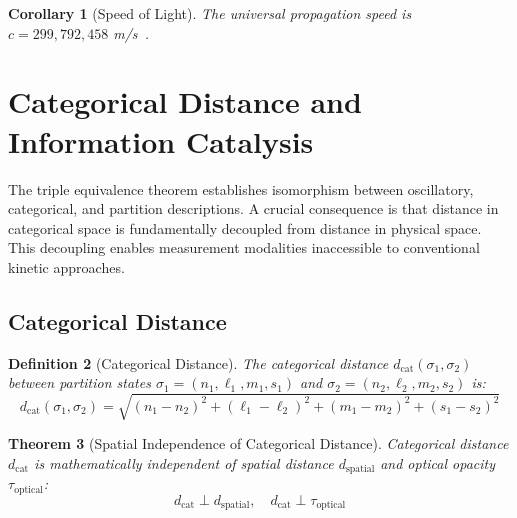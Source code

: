 \documentclass[aps,prd,twocolumn,superscriptaddress,floatfix,nofootinbib]{revtex4-2}
\newtheorem{theorem}{Theorem}[section]
\newtheorem{corollary}[theorem]{Corollary}
\newtheorem{definition}[theorem]{Definition}
\theoremstyle{remark}
\newcommand{\dcat}{d_{\mathrm{cat}}}
\begin{document}
\begin{corollary}[Speed of Light]
\label{cor:speed_light}
The universal propagation speed is $c = 299,792,458$ m/s~\cite{codata2018}.
\end{corollary}

\section{Categorical Distance and Information Catalysis}
\label{sec:categorical_distance}

The triple equivalence theorem establishes isomorphism between oscillatory, categorical, and partition descriptions. A crucial consequence is that distance in categorical space is fundamentally decoupled from distance in physical space. This decoupling enables measurement modalities inaccessible to conventional kinetic approaches.

\subsection{Categorical Distance}

\begin{definition}[Categorical Distance]
\label{def:cat_distance}
The categorical distance $\dcat(\sigma_1, \sigma_2)$ between partition states $\sigma_1 = (n_1, \ell_1, m_1, s_1)$ and $\sigma_2 = (n_2, \ell_2, m_2, s_2)$ is:
\begin{equation}
\dcat(\sigma_1, \sigma_2) = \sqrt{(n_1 - n_2)^2 + (\ell_1 - \ell_2)^2 + (m_1 - m_2)^2 + (s_1 - s_2)^2}
\end{equation}
\end{definition}

\begin{theorem}[Spatial Independence of Categorical Distance]
\label{thm:spatial_independence}
Categorical distance $\dcat$ is mathematically independent of spatial distance $d_{\mathrm{spatial}}$ and optical opacity $\tau_{\mathrm{optical}}$:
\begin{equation}
\dcat \perp d_{\mathrm{spatial}}, \quad \dcat \perp \tau_{\mathrm{optical}}
\end{equation}
\end{theorem}
\end{document}
